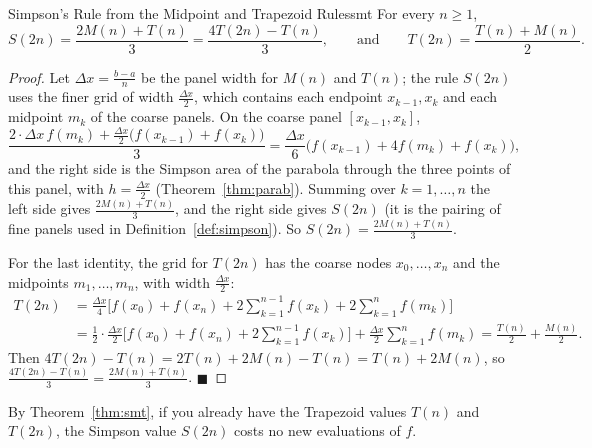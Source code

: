 \documentclass[11pt]{article}
\begin{document}
\begin{thm}{Simpson's Rule from the Midpoint and Trapezoid Rules}{smt}
For every $n\ge1$,
\[S(2n)=\frac{2M(n)+T(n)}3=\frac{4T(2n)-T(n)}3,\qquad\text{and}\qquad T(2n)=\frac{T(n)+M(n)}2.\]
\end{thm}
\begin{proof}
Let $\Delta x=\frac{b-a}n$ be the panel width for $M(n)$ and $T(n)$; the rule $S(2n)$ uses the finer grid of width $\frac{\Delta x}2$, which contains each endpoint $x_{k-1},x_k$ and each midpoint $m_k$ of the coarse panels. On the coarse panel $[x_{k-1},x_k]$,
\[\frac{2\cdot\Delta x\,f(m_k)+\frac{\Delta x}2\big(f(x_{k-1})+f(x_k)\big)}3=\frac{\Delta x}6\Big(f(x_{k-1})+4f(m_k)+f(x_k)\Big),\]
and the right side is the Simpson area of the parabola through the three points of this panel, with $h=\frac{\Delta x}2$ (Theorem~\ref{thm:parab}). Summing over $k=1,\ldots,n$ the left side gives $\frac{2M(n)+T(n)}3$, and the right side gives $S(2n)$ (it is the pairing of fine panels used in Definition~\ref{def:simpson}). So $S(2n)=\frac{2M(n)+T(n)}3$.

For the last identity, the grid for $T(2n)$ has the coarse nodes $x_0,\ldots,x_n$ and the midpoints $m_1,\ldots,m_n$, with width $\frac{\Delta x}2$:
\[\begin{aligned}T(2n)&=\frac{\Delta x}4\Big[f(x_0)+f(x_n)+2\sum_{k=1}^{n-1}f(x_k)+2\sum_{k=1}^nf(m_k)\Big]\\&=\frac12\cdot\frac{\Delta x}2\Big[f(x_0)+f(x_n)+2\sum_{k=1}^{n-1}f(x_k)\Big]+\frac{\Delta x}2\sum_{k=1}^nf(m_k)=\frac{T(n)}2+\frac{M(n)}2 .\end{aligned}\]
Then $4T(2n)-T(n)=2T(n)+2M(n)-T(n)=T(n)+2M(n)$, so $\frac{4T(2n)-T(n)}3=\frac{2M(n)+T(n)}3$. $\blacksquare$
\end{proof}

By Theorem~\ref{thm:smt}, if you already have the Trapezoid values $T(n)$ and $T(2n)$, the Simpson value $S(2n)$ costs no new evaluations of $f$.
\end{document}

